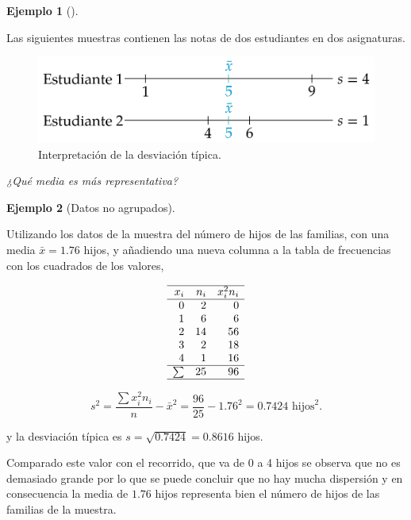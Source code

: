 \documentclass[
  a4paper,
]{scrreport}
\theoremstyle{plain}
\theoremstyle{definition}
\theoremstyle{definition}
\newtheorem{example}{Ejemplo}[chapter]
\theoremstyle{remark}
\begin{document}
\begin{example}[]\protect\hypertarget{exm-intrepretacion-desviacion-tipica}{}\label{exm-intrepretacion-desviacion-tipica}

Las siguientes muestras contienen las notas de dos estudiantes en dos
asignaturas.

\begin{figure}[H]

{\centering \includegraphics{img/descriptiva/interpretacion_desviacion_tipica.png}

}

\caption{Interpretación de la desviación típica.}

\end{figure}%

\emph{¿Qué media es más representativa?}

\end{example}

\begin{example}[Datos no
agrupados]\protect\hypertarget{exm-desviacion-tipica-datos-no-agrupados}{}\label{exm-desviacion-tipica-datos-no-agrupados}

Utilizando los datos de la muestra del número de hijos de las familias,
con una media \(\bar x=1.76\) hijos, y añadiendo una nueva columna a la
tabla de frecuencias con los cuadrados de los valores,

\[
\begin{array}{rrr}
\hline
x_i & n_i & x_i^2n_i \\
\hline
0 & 2 & 0 \\
1 & 6 & 6 \\
2 & 14 & 56\\
3 & 2  & 18\\
4 & 1 & 16 \\
\hline
\sum & 25 & 96 \\
\hline
\end{array}\]

\[s^2 = \frac{\sum x_i^2n_i}{n}-\bar x^2 = \frac{96}{25}-1.76^2= 0.7424 \mbox{ hijos}^2.\]

y la desviación típica es \(s=\sqrt{0.7424} = 0.8616\) hijos.

Comparado este valor con el recorrido, que va de 0 a 4 hijos se observa
que no es demasiado grande por lo que se puede concluir que no hay mucha
dispersión y en consecuencia la media de \(1.76\) hijos representa bien
el número de hijos de las familias de la muestra.

\end{example}
\end{document}
